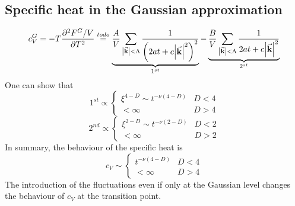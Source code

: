 \documentclass[../main/main.tex]{subfiles}
\begin{document}
\subsection{Specific heat in the Gaussian approximation}
\begin{equation}
  c_V^G = - T \pdv[2]{F^G/V}{T} \overset{to do}{=}   \underbrace{\frac{A}{V} \sum_{\abs{\va{k}} < \Lambda  }^{}
  \frac{1}{ \qty(2 a t + c \abs{\va{k}}^2 )^2}}_{1^{st}}
    - \underbrace{ \frac{B}{V} \sum_{\abs{\va{k}}< \Lambda  }^{} \frac{1}{2 a t + c \abs{\va{k}}^2 }}_{2^{st}}
\end{equation}
One can show that
\begin{equation}
1^{st} \propto
  \begin{cases}
   \xi ^{4-D} \sim t^{-\nu (4-D)}  & D < 4\\
  < \infty & D > 4
  \end{cases}
\end{equation}
\begin{equation}
2^{nd} \propto
  \begin{cases}
   \xi ^{2-D} \sim t^{-\nu (2-D)}  & D < 2\\
  < \infty & D > 2
  \end{cases}
\end{equation}
In summary, the behaviour of the specific heat is
\begin{equation}
  c_V \sim \begin{cases}
    t^{-\nu (4-D)} & D < 4 \\
    <\infty & D > 4
\end{cases}
\end{equation}
The introduction of the fluctuations even if only at the Gaussian level changes the behaviour of \( c_V \) at the transition point.
\end{document}
